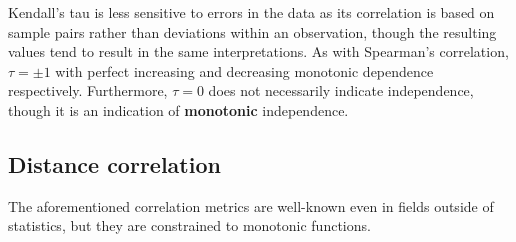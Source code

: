 Kendall's tau is less sensitive to errors in the data as its correlation is
based on sample pairs rather than deviations within an observation, though the
resulting values tend to result in the same interpretations. As with Spearman's
correlation, $\tau=\pm1$ with perfect increasing and decreasing monotonic
dependence respectively. Furthermore, $\tau=0$ does not necessarily indicate
independence, though it is an indication of \textbf{monotonic} independence.

\subsection{Distance correlation}

The aforementioned correlation metrics are well-known even in fields outside of
statistics, but they are constrained to monotonic functions. 
